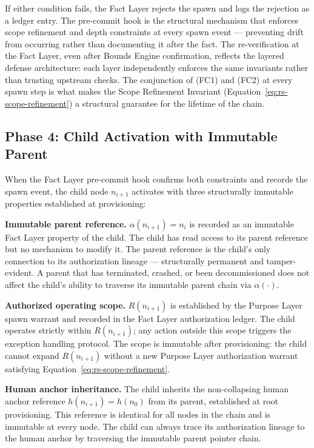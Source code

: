 If either condition fails, the Fact Layer rejects the spawn and logs the rejection as a ledger entry. The pre-commit hook is the structural mechanism that enforces scope refinement and depth constraints at every spawn event — preventing drift from occurring rather than documenting it after the fact. The re-verification at the Fact Layer, even after Bounds Engine confirmation, reflects the layered defense architecture: each layer independently enforces the same invariants rather than trusting upstream checks. The conjunction of (FC1) and (FC2) at every spawn step is what makes the Scope Refinement Invariant (Equation~\ref{eq:rs-scope-refinement}) a structural guarantee for the lifetime of the chain.

\subsection{Phase 4: Child Activation with Immutable Parent}
\label{sec:rs-phase4}

When the Fact Layer pre-commit hook confirms both constraints and records the spawn event, the child node $n_{i+1}$ activates with three structurally immutable properties established at provisioning:

\medskip
\noindent\textbf{Immutable parent reference.} $\alpha(n_{i+1}) = n_i$ is recorded as an immutable Fact Layer property of the child. The child has read access to its parent reference but no mechanism to modify it. The parent reference is the child's only connection to its authorization lineage — structurally permanent and tamper-evident. A parent that has terminated, crashed, or been decommissioned does not affect the child's ability to traverse its immutable parent chain via $\alpha(\cdot)$.

\medskip
\noindent\textbf{Authorized operating scope.} $R(n_{i+1})$ is established by the Purpose Layer spawn warrant and recorded in the Fact Layer authorization ledger. The child operates strictly within $R(n_{i+1})$; any action outside this scope triggers the exception handling protocol. The scope is immutable after provisioning: the child cannot expand $R(n_{i+1})$ without a new Purpose Layer authorization warrant satisfying Equation~\ref{eq:rs-scope-refinement}.

\medskip
\noindent\textbf{Human anchor inheritance.} The child inherits the non-collapsing human anchor reference $h(n_{i+1}) = h(n_0)$ from its parent, established at root provisioning. This reference is identical for all nodes in the chain and is immutable at every node. The child can always trace its authorization lineage to the human anchor by traversing the immutable parent pointer chain.

